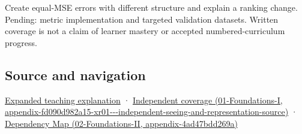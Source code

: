 Create equal-MSE errors with different structure and explain a ranking change. Pending: metric implementation and targeted validation datasets. Written coverage is not a claim of learner mastery or accepted numbered-curriculum progress.

\subsection{Source and navigation}\label{appendix-b2c1846508bf-source-and-navigation}

\hyperref[04-visual-computing-ii-ch042-quality-numbers-need-a-question-they-can-actually-answer]{Expanded teaching explanation} · \href{../01-Foundations-I/main.pdf\#nameddest=appendix-fd090d982a15-xr01---independent-seeing-and-representation-source}{Independent coverage (01-Foundations-I, appendix-fd090d982a15-xr01-\/-\/-independent-seeing-and-representation-source)} · \href{../02-Foundations-II/main.pdf\#nameddest=appendix-4ad47bdd269a}{Dependency Map (02-Foundations-II, appendix-4ad47bdd269a)}
